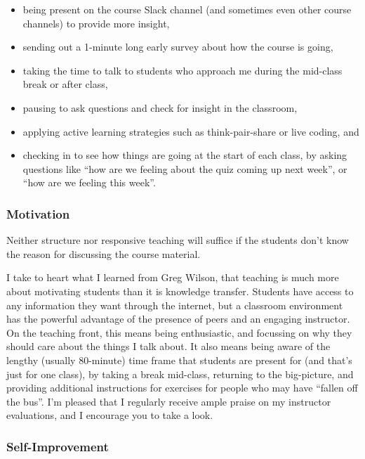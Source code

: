 \documentclass[]{article}
\providecommand{\tightlist}{%
  \setlength{\itemsep}{0pt}\setlength{\parskip}{0pt}}
\begin{document}
\begin{itemize}
\tightlist
\item
  being present on the course Slack channel (and sometimes even other course channels) to provide more insight,
\item
  sending out a 1-minute long early survey about how the course is going,
\item
  taking the time to talk to students who approach me during the mid-class break or after class,
\item
  pausing to ask questions and check for insight in the classroom,
\item
  applying active learning strategies such as think-pair-share or live coding, and
\item
  checking in to see how things are going at the start of each class, by asking questions like ``how are we feeling about the quiz coming up next week'', or ``how are we feeling this week''.
\end{itemize}

\hypertarget{motivation}{%
\subsubsection{Motivation}\label{motivation}}

Neither structure nor responsive teaching will suffice if the students don't know the reason for discussing the course material.

I take to heart what I learned from Greg Wilson, that teaching is much more about motivating students than it is knowledge transfer. Students have access to any information they want through the internet, but a classroom environment has the powerful advantage of the presence of peers and an engaging instructor. On the teaching front, this means being enthusiastic, and focussing on why they should care about the things I talk about. It also means being aware of the lengthy (usually 80-minute) time frame that students are present for (and that's just for one class), by taking a break mid-class, returning to the big-picture, and providing additional instructions for exercises for people who may have ``fallen off the bus''. I'm pleased that I regularly receive ample praise on my instructor evaluations, and I encourage you to take a look.

\hypertarget{self-improvement}{%
\subsubsection{Self-Improvement}\label{self-improvement}}
\end{document}
